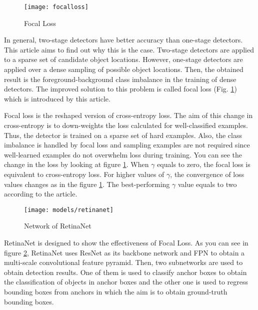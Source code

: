 \documentclass{article}
\begin{document}
\setlength{\parindent}{6ex}

\begin{figure}
    \centering
    \texttt{[image: focalloss]}
    \caption{Focal Loss}
    \label{fig:focalloss1}
\end{figure}

\indent

In general, two-stage detectors have better accuracy than one-stage 
detectors. This article aims to find out why this is the case. 
Two-stage detectors are applied to a sparse set of candidate object 
locations. However, one-stage detectors are applied over a dense sampling 
of possible object locations. Then, the obtained result is the 
foreground-background class imbalance in the training of dense detectors.
The improved solution to this problem is called focal loss (Fig. 
\ref{fig:focalloss1}) which is introduced by this article. \par

Focal loss \cite{flretnetcite} is the reshaped version of cross-entropy loss. The aim of 
this change in cross-entropy is to down-weights the loss calculated for 
well-classified examples. Thus, the detector is trained on a sparse set of 
hard examples. Also, the class imbalance is handled by focal loss and 
sampling examples are not required since well-learned examples do not 
overwhelm loss during training. You can see the change in the loss by looking at 
figure \ref{fig:focalloss1}. When $\gamma$ equals to zero, the focal loss is 
equivalent to cross-entropy loss. For higher values of $\gamma$, the 
convergence of loss values changes as in the figure \ref{fig:focalloss1}. 
The best-performing $\gamma$ value equals to two according to the article.

\begin{figure}
    \centering
    \texttt{[image: models/retinanet]}
    \caption{Network of RetinaNet}
    \label{fig:retinanet1}
\end{figure}
\indent

RetinaNet \cite{flretnetcite} is designed to show the effectiveness of Focal Loss. As you 
can see in figure \ref{fig:retinanet1}, RetinaNet uses ResNet as its 
backbone network and FPN to obtain a multi-scale convolutional feature 
pyramid. Then, two subnetworks are used to obtain detection results. 
One of them is used to classify anchor boxes to obtain the classification of 
objects in anchor boxes and the other one is used to regress bounding 
boxes from anchors in which the aim is to obtain ground-truth bounding 
boxes.
\end{document}
